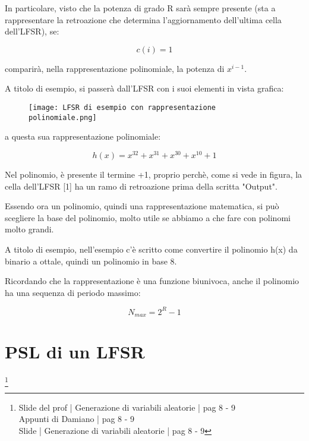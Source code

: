 In particolare, visto che la potenza di grado R sarà sempre presente 
(sta a rappresentare la retroazione che determina l'aggiornamento dell'ultima cella dell'LFSR), 
se: 

{
    \Large 
    \begin{equation}
        c(i) = 1
    \end{equation}
}

comparirà, nella rappresentazione polinomiale, 
la potenza di $x^{i-1}$. \newline 

A titolo di esempio, si passerà dall'LFSR con i suoi elementi in vista grafica: 

\begin{figure}[h]
    \centering
    \texttt{[image: LFSR di esempio con rappresentazione polinomiale.png]}
\end{figure}

a questa sua rappresentazione polinomiale: 

{
    \Large 
    \begin{equation}
        h(x) = x^{32} + x^{31} + x^{30} + x^{10} + 1
    \end{equation}
}

\begin{tcolorbox}
    Nel polinomio, è presente il termine +1, proprio perchè, 
    come si vede in figura, la cella dell'LFSR [1] ha un ramo di retroazione prima della scritta "Output".
\end{tcolorbox}

Essendo ora un polinomio, quindi una rappresentazione matematica, 
si può scegliere la base del polinomio, molto utile se abbiamo a che fare con polinomi molto grandi. \newline 

\begin{tcolorbox}
    A titolo di esempio, nell'esempio c'è scritto come convertire il polinomio h(x) da binario a ottale, 
    quindi un polinomio in base 8.
\end{tcolorbox}

Ricordando che la rappresentazione è una funzione biunivoca, 
anche il polinomio ha una sequenza di periodo massimo: 

{
    \Large 
    \begin{equation}
        N_{max} = 2^{R} - 1
    \end{equation}
}


\newpage 

\section{PSL di un LFSR}
\footnote{Slide del prof | Generazione di variabili aleatorie | pag 8 - 9\\
Appunti di Damiano | pag 8 - 9\\
Slide | Generazione di variabili aleatorie | pag  8 - 9 
} 

